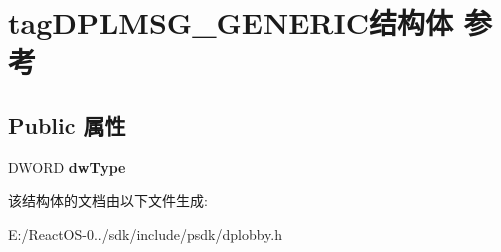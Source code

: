 \hypertarget{structtag_d_p_l_m_s_g___g_e_n_e_r_i_c}{}\section{tag\+D\+P\+L\+M\+S\+G\+\_\+\+G\+E\+N\+E\+R\+I\+C结构体 参考}
\label{structtag_d_p_l_m_s_g___g_e_n_e_r_i_c}
\subsection*{Public 属性}
\begin{DoxyCompactItemize}
\item 
\mbox{\label{structtag_d_p_l_m_s_g___g_e_n_e_r_i_c_a41a4714f5c265e305794b9debef5df31}} 
D\+W\+O\+RD {\bfseries dw\+Type}
\end{DoxyCompactItemize}


该结构体的文档由以下文件生成\+:\begin{DoxyCompactItemize}
\item 
E\+:/\+React\+O\+S-\/0../sdk/include/psdk/dplobby.\+h\end{DoxyCompactItemize}
